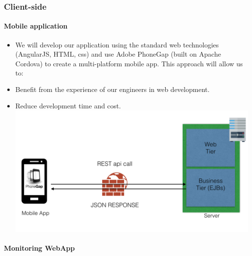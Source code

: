 \documentclass[]{article}
\let\oldparagraph\paragraph
\renewcommand{\paragraph}[1]{\oldparagraph{#1}\mbox{}}
\begin{document}
\subsubsection{Client-side}\label{client-side}

\paragraph{Mobile application}\label{mobile-application}

\begin{itemize}
\item
  We will develop our application using the standard web technologies
  (AngularJS, HTML, css) and use Adobe PhoneGap (built on Apache
  Cordova) to create a multi-platform mobile app. This approach will
  allow us to:
\item
  Benefit from the experience of our engineers in web development.
\item
  Reduce development time and cost.\newline
  \includegraphics[width=1.00000\textwidth,height=1.00000\textwidth]{./images/appArch.png}
\end{itemize}

\paragraph{Monitoring WebApp}\label{monitoring-webapp}
\end{document}
